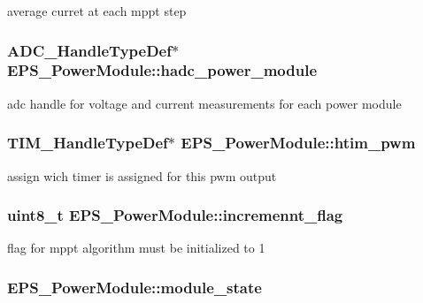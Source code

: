 average curret at each mppt step \hypertarget{struct_e_p_s___power_module_af8e5b3c170ecdd8170ec7186b923dc96}{
\subsubsection[{hadc\-\_\-power\-\_\-module}]{\setlength{\rightskip}{0pt plus 5cm}A\-D\-C\-\_\-\-Handle\-Type\-Def$\ast$ E\-P\-S\-\_\-\-Power\-Module\-::hadc\-\_\-power\-\_\-module}}\label{struct_e_p_s___power_module_af8e5b3c170ecdd8170ec7186b923dc96}
adc handle for voltage and current measurements for each power module \hypertarget{struct_e_p_s___power_module_a5ad473552e5fd9414c52f36b79303166}{
\subsubsection[{htim\-\_\-pwm}]{\setlength{\rightskip}{0pt plus 5cm}T\-I\-M\-\_\-\-Handle\-Type\-Def$\ast$ E\-P\-S\-\_\-\-Power\-Module\-::htim\-\_\-pwm}}\label{struct_e_p_s___power_module_a5ad473552e5fd9414c52f36b79303166}
assign wich timer is assigned for this pwm output \hypertarget{struct_e_p_s___power_module_af6a8b8e716cbb721a278fe363ef6e419}{
\subsubsection[{incremennt\-\_\-flag}]{\setlength{\rightskip}{0pt plus 5cm}uint8\-\_\-t E\-P\-S\-\_\-\-Power\-Module\-::incremennt\-\_\-flag}}\label{struct_e_p_s___power_module_af6a8b8e716cbb721a278fe363ef6e419}
flag for mppt algorithm must be initialized to 1 \hypertarget{struct_e_p_s___power_module_a9a52d5c5d5ced69c7df0f68217deffe9}{
\subsubsection[{module\-\_\-state}]{ E\-P\-S\-\_\-\-Power\-Module\-::module\-\_\-state}}\label{struct_e_p_s___power_module_a9a52d5c5d5ced69c7df0f68217deffe9}

